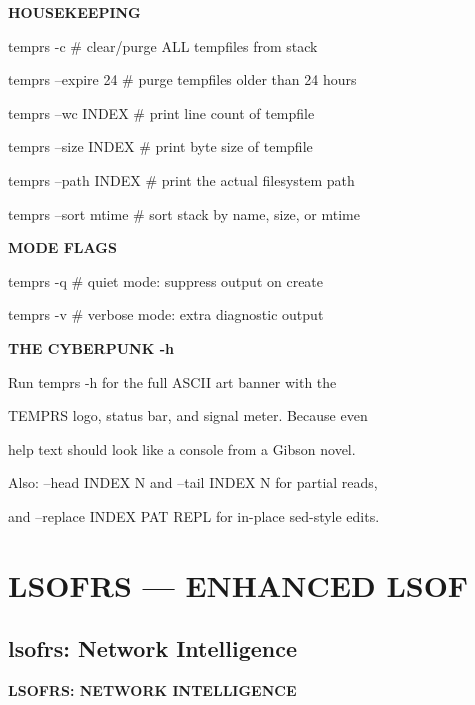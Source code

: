 \documentclass[11pt,a4paper,twoside]{book}
\begin{document}
\vspace{12pt}
{\bfseries\color{neonyellow} HOUSEKEEPING}\vspace{4pt}

temprs -c           \# clear/purge ALL tempfiles from stack

temprs --expire 24  \# purge tempfiles older than 24 hours

temprs --wc INDEX   \# print line count of tempfile

temprs --size INDEX \# print byte size of tempfile

temprs --path INDEX \# print the actual filesystem path

temprs --sort mtime \# sort stack by name, size, or mtime


\vspace{12pt}
{\bfseries\color{neonyellow} MODE FLAGS}\vspace{4pt}

temprs -q           \# quiet mode: suppress output on create

temprs -v           \# verbose mode: extra diagnostic output


\vspace{12pt}
{\bfseries\color{neonyellow} THE CYBERPUNK -h}\vspace{4pt}

Run temprs -h for the full ASCII art banner with the

TEMPRS logo, status bar, and signal meter. Because even

help text should look like a console from a Gibson novel.

Also: --head INDEX N and --tail INDEX N for partial reads,

and --replace INDEX PAT REPL for in-place sed-style edits.


\vspace{16pt}


\chapter{LSOFRS — ENHANCED LSOF}

\section{lsofrs: Network Intelligence}


\vspace{10pt}
{\large\bfseries\color{neoncyan} LSOFRS: NETWORK INTELLIGENCE}\vspace{6pt}
\end{document}
